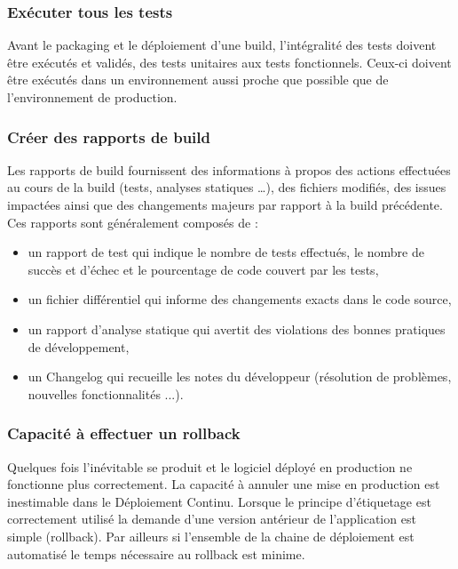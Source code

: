       \subsubsection{Exécuter tous les tests}
      Avant le packaging et le déploiement d’une build, l’intégralité des tests doivent être exécutés et validés, des tests unitaires aux tests fonctionnels. Ceux-ci doivent être exécutés dans un environnement aussi proche que possible que de l’environnement de production.

      \subsubsection{Créer des rapports de build}
      Les rapports de build fournissent des informations à propos des actions effectuées au cours de la build (tests, analyses statiques …), des fichiers modifiés, des issues impactées ainsi que des changements majeurs par rapport à la build précédente. Ces rapports sont généralement composés de :\\
      \begin{itemize}
        \item un rapport de test qui indique le nombre de tests effectués, le nombre de succès et d’échec et le pourcentage de code couvert par les tests,
        \item un fichier différentiel qui informe des changements exacts dans le code source,
        \item un rapport d’analyse statique qui avertit des violations des bonnes pratiques de développement,
        \item un Changelog qui recueille les notes du développeur (résolution de problèmes, nouvelles fonctionnalités ...).\\
      \end{itemize}

      \subsubsection{Capacité à effectuer un rollback}
      Quelques fois l’inévitable se produit et le logiciel déployé en production ne fonctionne plus correctement. La capacité à annuler une mise en production est inestimable dans le Déploiement Continu. Lorsque le principe d’étiquetage est correctement utilisé la demande d’une version antérieur de l’application est simple (rollback). Par ailleurs si l’ensemble de la chaine de déploiement est automatisé le temps nécessaire au rollback est minime.

